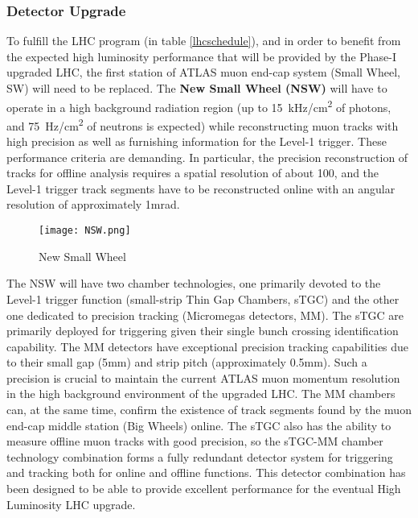 
\subsubsection{Detector Upgrade}

To fulfill the LHC program (in table \ref{lhcschedule}), and in order to benefit from the expected high luminosity
performance that will be provided by the Phase-I upgraded LHC, the first station of ATLAS muon end-cap system (Small
Wheel, SW) will need to be replaced.  The {\bf New Small Wheel (NSW)} will have to operate in a high background radiation
region (up to \SI{15}{kHz/cm^2} of photons, and \SI{75}{Hz/cm^2} of neutrons is expected) while reconstructing muon tracks with high precision as well as furnishing information for
the Level-1 trigger. These performance criteria are demanding. In particular, the precision reconstruction of tracks for
offline analysis requires a spatial resolution of about 100, and the Level-1 trigger track segments have to be
reconstructed online with an angular resolution of approximately 1mrad. \par
\begin{figure}[ht]
		\centering
		\texttt{[image: NSW.png]}
		\caption{New Small Wheel}\label{fig:nsw}
\end{figure}

The NSW will have two chamber technologies, one primarily devoted to the Level-1 trigger function (small-strip Thin Gap
Chambers, sTGC) and the other one dedicated to precision tracking (Micromegas detectors, MM). The sTGC are primarily deployed for
triggering given their single bunch crossing identification capability. The MM detectors have exceptional precision
tracking capabilities due to their small gap (\unit{5}{mm}) and strip pitch (approximately 0.5\si{mm}). Such a precision is
crucial to maintain the current ATLAS muon momentum resolution in the high background environment of the upgraded LHC.
The MM chambers can, at the same time, confirm the existence of track segments found by the muon end-cap middle
station (Big Wheels) online. The sTGC also has the ability to measure offline muon tracks with good precision, so the
sTGC-MM chamber technology combination forms a fully redundant detector system for triggering and tracking both for
online and offline functions. This detector combination has been designed to be able to provide excellent
performance for the eventual High Luminosity LHC upgrade.\par 



